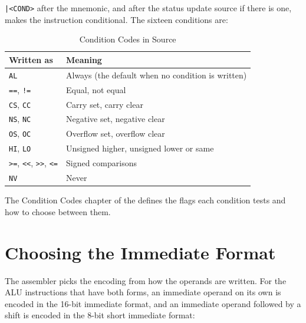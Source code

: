 \texttt{|<COND>} after the mnemonic, and after the status update source if there is one, makes the instruction
conditional. The sixteen conditions are:

\begin{table}[H]
	\centering
	\begin{tabular}{lp{9cm}}
		\toprule
		\textbf{Written as}                                    & \textbf{Meaning}                                  \\
		\midrule
		\texttt{AL}                                            & Always (the default when no condition is written) \\
		\texttt{==}, \texttt{!=}                               & Equal, not equal                                  \\
		\texttt{CS}, \texttt{CC}                               & Carry set, carry clear                            \\
		\texttt{NS}, \texttt{NC}                               & Negative set, negative clear                      \\
		\texttt{OS}, \texttt{OC}                               & Overflow set, overflow clear                      \\
		\texttt{HI}, \texttt{LO}                               & Unsigned higher, unsigned lower or same           \\
		\texttt{>=}, \texttt{<{}<}, \texttt{>{}>}, \texttt{<=} & Signed comparisons                                \\
		\texttt{NV}                                            & Never                                             \\
		\bottomrule
	\end{tabular}
	\caption{Condition Codes in Source}
	\label{tab:conditions-in-source}
\end{table}

The Condition Codes chapter of the \archmanual{} defines the flags each condition tests and how to choose between them.

\section{Choosing the Immediate Format}

The assembler picks the encoding from how the operands are written. For the ALU instructions that have both forms, an
immediate operand on its own is encoded in the 16-bit immediate format, and an immediate operand followed by a shift is
encoded in the 8-bit short immediate format:

